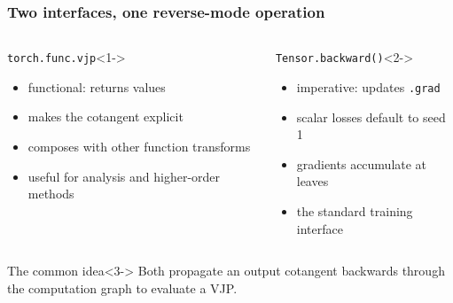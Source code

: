\documentclass[]{article}
\begin{document}
\begin{frame}
\frametitle{Two interfaces, one reverse-mode operation}

\begin{columns}
	\begin{block}{\texttt{torch.func.vjp}}<1->
		\begin{itemize}
			\item functional: returns values
			\item makes the cotangent explicit
			\item composes with other function transforms
			\item useful for analysis and higher-order methods
		\end{itemize}
	\end{block}

	\begin{block}{\texttt{Tensor.backward()}}<2->
		\begin{itemize}
			\item imperative: updates \texttt{.grad}
			\item scalar losses default to seed 1
			\item gradients accumulate at leaves
			\item the standard training interface
		\end{itemize}
	\end{block}
\end{columns}

\begin{alertblock}{The common idea}<3->
	Both propagate an output cotangent backwards through the computation graph to evaluate a VJP.
\end{alertblock}
\end{frame}


\end{document}
